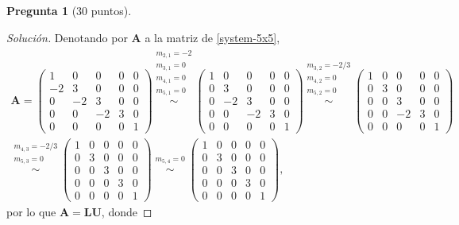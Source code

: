 \documentclass[letterpaper,12pt]{article}
\theoremstyle{definition}
\newtheorem{question}{Pregunta}
\numberwithin{equation}{question}
\newenvironment{solution}{\begin{proof}[Solución]}{\end{proof}}
\begin{document}
\begin{question}[30 puntos]
\begin{solution}
Denotando por $\boldsymbol{A}$ a la matriz de \eqref{system-5x5},
%
\begin{multline*}
\boldsymbol{A} =
\begin{pmatrix}
1 & 0 & 0 & 0 & 0\\
-2 & 3 & 0 & 0 & 0\\
0 & -2 & 3 & 0 & 0\\
0 & 0 & -2 & 3 & 0\\
0 & 0 & 0 & 0 & 1
\end{pmatrix}
\stackrel{\substack{m_{2,1} = -2\\m_{3,1} = 0\\m_{4,1} = 0\\m_{5,1} = 0}}{\sim}
\begin{pmatrix}
1 & 0 & 0 & 0 & 0\\
0 & 3 & 0 & 0 & 0\\
0 & -2 & 3 & 0 & 0\\
0 & 0 & -2 & 3 & 0\\
0 & 0 & 0 & 0 & 1
\end{pmatrix}
\stackrel{\substack{m_{3,2} = -2/3\\m_{4,2} = 0\\m_{5,2} = 0}}{\sim}
\begin{pmatrix}
1 & 0 & 0 & 0 & 0\\
0 & 3 & 0 & 0 & 0\\
0 & 0 & 3 & 0 & 0\\
0 & 0 & -2 & 3 & 0\\
0 & 0 & 0 & 0 & 1
\end{pmatrix}\\
\stackrel{\substack{m_{4,3} = -2/3\\m_{5,3} = 0}}{\sim}
\begin{pmatrix}
1 & 0 & 0 & 0 & 0\\
0 & 3 & 0 & 0 & 0\\
0 & 0 & 3 & 0 & 0\\
0 & 0 & 0 & 3 & 0\\
0 & 0 & 0 & 0 & 1
\end{pmatrix}
\stackrel{\substack{m_{5,4} = 0}}{\sim}
\begin{pmatrix}
1 & 0 & 0 & 0 & 0\\
0 & 3 & 0 & 0 & 0\\
0 & 0 & 3 & 0 & 0\\
0 & 0 & 0 & 3 & 0\\
0 & 0 & 0 & 0 & 1
\end{pmatrix},
\end{multline*}
%
por lo que $\boldsymbol{A} = \boldsymbol{L} \boldsymbol{U}$, donde

\end{solution}
\end{question}
\end{document}
